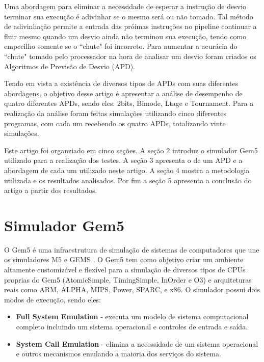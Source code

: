 \documentclass[12pt]{article}
\begin{document}
Uma abordagem para eliminar a necessidade de esperar a instrução de desvio terminar sua execução é adivinhar se o mesmo será ou não tomado. Tal método de adivinhação permite a entrada das próimas instruções no pipeline continuar a fluir mesmo quando um desvio ainda não terminou sua execução, tendo como empecilho somente se o ``chute" foi incorreto. Para aumentar a acurácia do ``chute" tomado pelo processador na hora de analisar um desvio foram criados os Algoritmos de Previsão de Desvio (APD).

Tendo em vista a existência de diversos tipos de APDs com suas diferentes abordagens, o objetivo desse artigo é apresentar a análise de desempenho de quatro diferentes APDs, sendo eles: 2bits, Bimode, Ltage e Tournament. Para a realização da análise foram feitas simulações utilizando cinco diferentes programas, com cada um recebendo os quatro APDs, totalizando vinte simulações.

Este artigo foi organziado em cinco seções. A seção 2 introduz o simulador Gem5 utilizado para a realização dos testes. A seção 3 apresenta o de um APD e a abordagem de cada um utilizado neste artigo. A seção 4 mostra a metodologia utilizada e os resultados analisados. Por fim a seção 5 apresenta a conclusão do artigo a partir dos resultados.

\section{Simulador Gem5}

O Gem5 é uma infraestrutura de simulação de sistemas de computadores que une os simuladores M5 e GEMS \cite{binkert2011gem5}. O Gem5 tem como objetivo criar um ambiente altamente customizável e flexível para a simulação de diversos tipos de CPUs proprias do Gem5 (AtomicSimple, TimingSimple, InOrder e O3) e arquiteturas reais como ARM, ALPHA, MIPS, Power, SPARC, e x86. O simulador possui dois modos de execução, sendo eles:

\begin{itemize}

    \item \textbf{Full System Emulation} - executa um modelo de sistema computacional completo incluindo um sistema operacional e controles de entrada e saída.
    
    \item \textbf{System Call Emulation} - elimina a necessidade de um sistema operacional e outros mecanismos emulando a maioria dos serviços do sistema.
    
\end{itemize}
\end{document}
